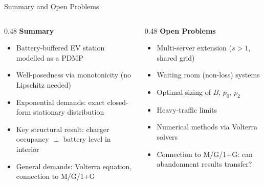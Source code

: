 \documentclass[aspectratio=169]{beamer}
\begin{document}
\begin{frame}{Summary and Open Problems}

  \begin{columns}
    \begin{column}{0.48\textwidth}
      \textbf{Summary}
      \begin{itemize}
        \setlength\itemsep{0.5em}
        \item Battery-buffered EV station modelled as a PDMP
        \item Well-posedness via monotonicity (no Lipschitz needed)
        \item Exponential demands: exact closed-form stationary distribution
        \item Key structural result: charger occupancy $\perp$ battery level in interior
        \item General demands: Volterra equation, connection to M/G/1+G
      \end{itemize}
    \end{column}
    \begin{column}{0.48\textwidth}
      \textbf{Open Problems}
      \begin{itemize}
        \setlength\itemsep{0.5em}
        \item Multi-server extension ($s > 1$, shared grid)
        \item Waiting room (non-loss) systems
        \item Optimal sizing of $B$, $p_0$, $p_2$
        \item Heavy-traffic limits
        \item Numerical methods via Volterra solvers
        \item Connection to M/G/1+G: can abandonment results transfer?
      \end{itemize}
    \end{column}
  \end{columns}

\end{frame}
\end{document}
